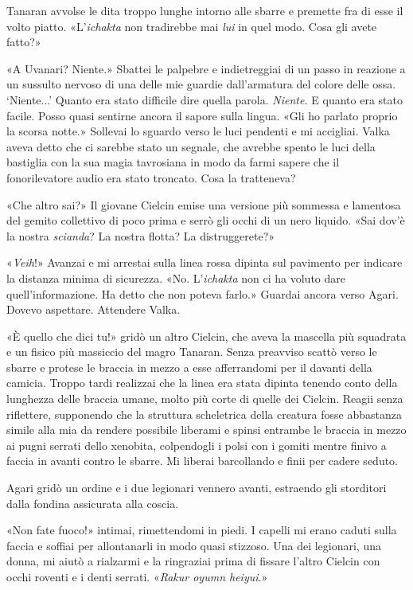 Tanaran avvolse le dita troppo lunghe intorno alle sbarre e premette fra
di esse il volto piatto. «L'\emph{ichakta} non tradirebbe mai \emph{lui}
in quel modo. Cosa gli avete fatto?»

«A Uvanari? Niente.» Sbattei le palpebre e indietreggiai di un passo in
reazione a un sussulto nervoso di una delle mie guardie dall'armatura
del colore delle ossa. `Niente...' Quanto era stato difficile dire
quella parola. \emph{Niente.} E quanto era stato facile. Posso quasi
sentirne ancora il sapore sulla lingua. «Gli ho parlato proprio la
scorsa notte.» Sollevai lo sguardo verso le luci pendenti e mi
accigliai. Valka aveva detto che ci sarebbe stato un segnale, che
avrebbe spento le luci della bastiglia con la sua magia tavrosiana in
modo da farmi sapere che il fonorilevatore audio era stato troncato.
Cosa la tratteneva?

«Che altro sai?» Il giovane Cielcin emise una versione più sommessa e
lamentosa del gemito collettivo di poco prima e serrò gli occhi di un
nero liquido. «Sai dov'è la nostra \emph{scianda}? La nostra flotta? La
distruggerete?»

«\emph{Veih}!» Avanzai e mi arrestai sulla linea rossa dipinta sul
pavimento per indicare la distanza minima di sicurezza. «No.
L'\emph{ichakta} non ci ha voluto dare quell'informazione. Ha detto che
non poteva farlo.» Guardai ancora verso Agari. Dovevo aspettare.
Attendere Valka.

«È quello che dici tu!» gridò un altro Cielcin, che aveva la mascella
più squadrata e un fisico più massiccio del magro Tanaran. Senza
preavviso scattò verso le sbarre e protese le braccia in mezzo a esse
afferrandomi per il davanti della camicia. Troppo tardi realizzai che la
linea era stata dipinta tenendo conto della lunghezza delle braccia
umane, molto più corte di quelle dei Cielcin. Reagii senza riflettere,
supponendo che la struttura scheletrica della creatura fosse abbastanza
simile alla mia da rendere possibile liberami e spinsi entrambe le
braccia in mezzo ai pugni serrati dello xenobita, colpendogli i polsi
con i gomiti mentre finivo a faccia in avanti contro le sbarre. Mi
liberai barcollando e finii per cadere seduto.

Agari gridò un ordine e i due legionari vennero avanti, estraendo gli
storditori dalla fondina assicurata alla coscia.

«Non fate fuoco!» intimai, rimettendomi in piedi. I capelli mi erano
caduti sulla faccia e soffiai per allontanarli in modo quasi stizzoso.
Una dei legionari, una donna, mi aiutò a rialzarmi e la ringraziai prima
di fissare l'altro Cielcin con occhi roventi e i denti serrati.
«\emph{Rakur oyumn heiyui}.»

